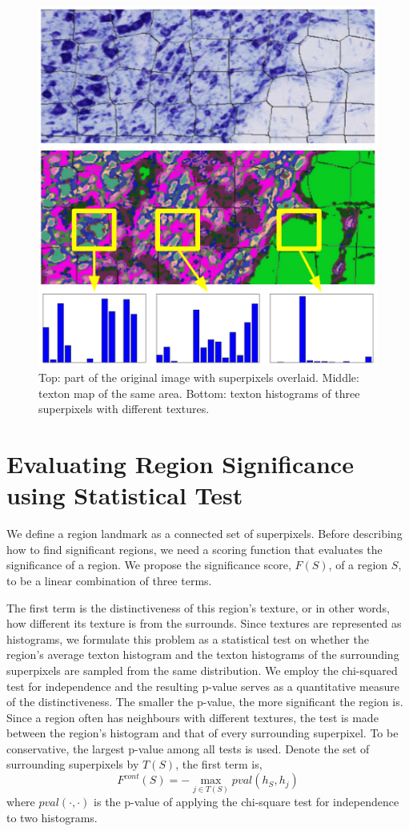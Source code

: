 \documentclass{llncs}
\begin{document}
\begin{figure}
	\includegraphics[width=.5\textwidth]{../figures/TextonHistComparisonWithArrows.png}
	\caption{Top: part of the original image with superpixels overlaid. Middle: texton map of the same area. Bottom: texton histograms of three superpixels with different textures.}
	\label{fig:TextonHistComparison}
\end{figure}


\section{Evaluating Region Significance using Statistical Test}

We define a region landmark as a connected set of superpixels. Before describing how to find significant regions, we need a scoring function that evaluates the significance of a region. We propose the significance score, $F(S)$, of a region $S$, to be a linear combination of three terms. 

The first term is the distinctiveness of this region's texture, or in other words, how different its texture is from the surrounds. Since textures are represented as histograms, we formulate this problem as a statistical test on whether the region's average texton histogram and the texton histograms of the surrounding superpixels are sampled from the same distribution. We employ the chi-squared test for independence and the resulting p-value serves as a quantitative measure of the distinctiveness. The smaller the p-value, the more significant the region is. Since a region often has neighbours with different textures, the test is made between the region's histogram and that of every surrounding superpixel. To be conservative, the largest p-value among all tests is used. Denote the set of surrounding superpixels by $T(S)$, the first term is,
$$F^{cont}(S) = - \max_{j\in T(S)} pval(h_S, h_j)$$
where $pval(\cdot,\cdot)$ is the p-value of applying the chi-square test for independence to two histograms.
\end{document}
